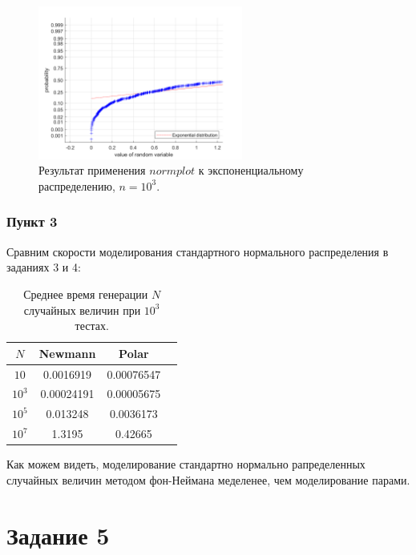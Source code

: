\documentclass[oneside, final, 12pt]{article}
\begin{document}
	\begin{figure}[h!]
		\centering
		\includegraphics[width=0.6\textwidth]{../code/Task_4/pict/norm_exp_ex.png}
		\caption{Результат применения $normplot$ к экспоненциальному распределению, $n=10^3.$}
    \end{figure}
	
\newpage
\subsubsection{Пункт 3}
	\noindent
	Сравним скорости моделирования стандартного нормального распределения в заданиях 3 и 4:
	\begin{table}[h!]
	\begin{center}
		\begin{tabular}{|c|c|c|c|}
			\hline $N$ & Newmann & Polar   \\ \hline
				$10$ 	&  0.0016919  &  0.00076547\\ \hline
				$10^3$ & 0.00024191  &  0.00005675 \\ \hline
				$10^5$ & 0.013248  &   0.0036173 \\ \hline
				$10^7$ & 1.3195 &  0.42665 \\ \hline
		\end{tabular}
		\caption{ \centering  Среднее время генерации $N$ случайных величин при $10^3$ тестах.}
	\end{center}
	\end{table}

	Как можем видеть, моделирование стандартно нормально рапределенных случайных величин
	методом фон-Неймана  меделенее, чем моделирование парами.
	
\newpage
\section{Задание 5}
\end{document}
